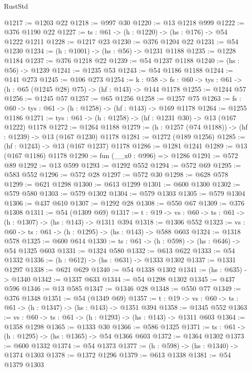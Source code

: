 \begin{lexlean}{RustStd}
\begin{coremodule}
@1217 := @1203 @22
@1218 := @997 @30
@1220 := @13 @1218 @999
@1222 := @376 @1190 @22
@1227 := {ts : @61} -> (h : @1220) -> (hs : @176) -> @54 @1222 @1211
@1228 := @1217 @23
@1230 := @376 @1204 @22
@1231 := @54 @1230
@1234 := (h : @1001) -> (hs : @56) -> @1231 @1188
@1235 := @1228 @1184
@1237 := @376 @1218 @22
@1239 := @54 @1237 @1188
@1240 := (hs : @56) -> @1239
@1241 := @1235 @53
@1243 := @54 @1186 @1188
@1244 := @141 @273
@1245 := @106 @273
@1254 := {k : @58} ->
  {fs : @60} -> {tys : @61} -> (h : @65 (@1245 @28) @75) -> (hf : @143) -> @144 @1178
@1255 := @1244 @57
@1256 := @1245 @57
@1257 := @65 @1256
@1258 := @1257 @75
@1263 := {fs : @60} -> {tys : @61} -> (h : @1258) -> (hf : @143) -> @169 @1178
@1264 := @1255 @1186
@1271 := {tys : @61} -> (h : @1258) -> (hf : @1231 @30) -> @13 (@167 @1222) @1178
@1272 := @1264 @1188
@1279 := (h : @1257 (@74 @1188)) -> (hf : @1239) -> @13 (@167 @1230) @1178
@1281 := @1272 (@189 @1256)
@1285 := (hf : @1243) -> @13 (@167 @1237) @1178
@1286 := @1281 @1241
@1289 := @13 (@167 @1186) @1178
@1290 := fun (__x0 : @996) => @1286
@1291 := @572 @89
@1292 := @13 @599
@1293 := @1292 @552
@1294 := @572 @69
@1295 := @583 @552
@1296 := @572 @28
@1297 := @572 @30
@1298 := @628 @578
@1299 := @621 @1298
@1300 := @613 @1299
@1301 := @600 @1300
@1302 := @579 @580
@1303 := @579 @1302
@1304 := @579 @1303
@1305 := @579 @1304
@1306 := @437 @610
@1307 := @1292 @28
@1308 := @550 @67
@1309 := @376 @1308
@1311 := @54 (@1309 @69)
@1317 := {t : @19} -> {vs : @60} -> {ts : @61} -> (h : @1307) -> (hs : @143) -> @1311 @394
@1318 := @1306 @552
@1323 := {vs : @60} -> {ts : @61} -> (h : @1295) -> (hs : @143) -> @588 @603
@1324 := @1318 @578
@1325 := @600 @614
@1330 := {ts : @61} -> (h : @598) -> (hs : @646) -> @54 @1325 @603
@1331 := @1324 @580
@1332 := @613 @622
@1333 := @54 @1332
@1336 := (h : @612) -> (hs : @631) -> @1333 @1302
@1337 := @1331 @1297
@1338 := @621 @629
@1340 := @54 @1338 @1302
@1341 := (hs : @635) -> @1340
@1342 := @1337 @633
@1344 := @54 @1298 @1302
@1345 := @437 @596
@1346 := @13 @585
@1347 := @1346 @28
@1348 := @550 @77
@1349 := @376 @1348
@1351 := @54 (@1349 @69)
@1357 := {t : @19} -> {vs : @60} -> {ts : @61} -> (h : @1347) -> (hs : @143) -> @1351 @394
@1358 := @1345 @552
@1363 := {vs : @60} -> {ts : @61} -> (h : @1293) -> (hs : @143) -> @1311 @603
@1364 := @1358 @1298
@1365 := @1333 @30
@1366 := @586 @1325
@1371 := {ts : @61} -> (h : @1295) -> (hs : @1365) -> @54 @1366 @603
@1372 := @1364 @1302
@1373 := @600 @1332
@1374 := @54 @1373
@1377 := (h : @598) -> (hs : @1340) -> @1374 @1303
@1378 := @1372 @1296
@1379 := @613 @1338
@1381 := @54 @1379 @1303

\end{coremodule}
\end{lexlean}
